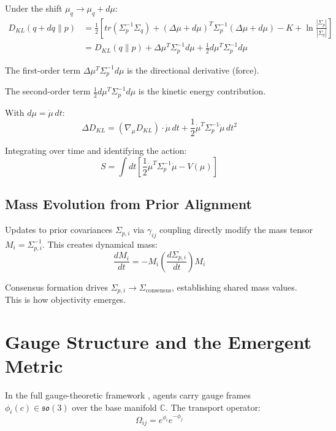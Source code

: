 \documentclass[11pt]{article}
\begin{document}
Under the shift $\mu_q \to \mu_q + d\mu$:
\begin{align}
D_{KL}(q + dq \| p) &= \frac{1}{2}\left[tr(\Sigma_p^{-1}\Sigma_q) + (\Delta\mu + d\mu)^T \Sigma_p^{-1} (\Delta\mu + d\mu) - K + \ln\frac{|\Sigma_p|}{|\Sigma_q|}\right] \\
&= D_{KL}(q \| p) + \Delta\mu^T \Sigma_p^{-1} d\mu + \frac{1}{2} d\mu^T \Sigma_p^{-1} d\mu
\end{align}

The first-order term $\Delta\mu^T \Sigma_p^{-1} d\mu$ is the directional derivative (force).

The second-order term $\frac{1}{2} d\mu^T \Sigma_p^{-1} d\mu$ is the kinetic energy contribution.

With $d\mu = \dot{\mu}\, dt$:
\begin{equation}
\Delta D_{KL} = \left(\nabla_\mu D_{KL}\right) \cdot \dot{\mu}\, dt + \frac{1}{2} \dot{\mu}^T \Sigma_p^{-1} \dot{\mu}\, dt^2
\end{equation}

Integrating over time and identifying the action:
\begin{equation}
S = \int dt \left[\frac{1}{2} \dot{\mu}^T \Sigma_p^{-1} \dot{\mu} - V(\mu)\right]
\end{equation}

\subsection*{Mass Evolution from Prior Alignment}

Updates to prior covariances $\Sigma_{p,i}$ via $\gamma_{ij}$ coupling 
directly modify the mass tensor $M_i = \Sigma_{p,i}^{-1}$. This creates 
dynamical mass:
\begin{equation}
\frac{dM_i}{dt} = -M_i \left(\frac{d\Sigma_{p,i}}{dt}\right) M_i
\end{equation}

Consensus formation drives $\Sigma_{p,i} \to \Sigma_{\text{consensus}}$, 
establishing shared mass values. This is how objectivity emerges.



\section{Gauge Structure and the Emergent Metric}
\label{app:gauge}

In the full gauge-theoretic framework \cite{Dennis2025a}, agents carry gauge frames $\phi_i(c) \in \mathfrak{so}(3)$ over the base manifold $\mathbb{C}$. The transport operator:
\begin{equation}
\Omega_{ij} = e^{\phi_i} e^{-\phi_j}
\end{equation}
\end{document}

